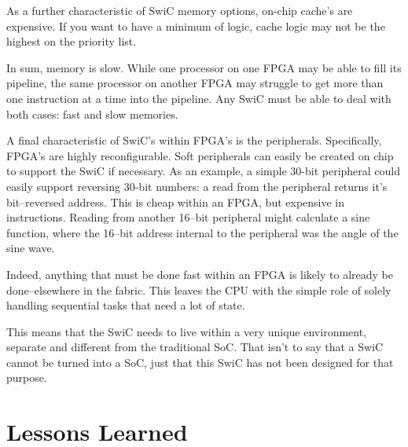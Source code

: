 \documentclass{gqtekspec}
\begin{document}
As a further characteristic of SwiC memory options, on-chip cache's are
expensive.  If you want to have a minimum of logic, cache logic may not be
the highest on the priority list.

In sum, memory is slow.  While one processor on one FPGA may be able to fill
its pipeline, the same processor on another FPGA may struggle to get more than
one instruction at a time into the pipeline.  Any SwiC must be able to deal
with both cases: fast and slow memories.

A final characteristic of SwiC's within FPGA's is the peripherals. 
Specifically, FPGA's are highly reconfigurable.  Soft peripherals can easily
be created on chip to support the SwiC if necessary.  As an example, a simple
30-bit peripheral could easily support reversing 30-bit numbers: a read from
the peripheral returns it's bit--reversed address.  This is cheap within an
FPGA, but expensive in instructions.  Reading from another 16--bit peripheral
might calculate a sine function, where the 16--bit address internal to the
peripheral was the angle of the sine wave.

Indeed, anything that must be done fast within an FPGA is likely to already
be done--elsewhere in the fabric.  This leaves the CPU with the simple role
of solely handling sequential tasks that need a lot of state.

This means that the SwiC needs to live within a very unique environment,
separate and different from the traditional SoC.  That isn't to say that a 
SwiC cannot be turned into a SoC, just that this SwiC has not been designed
for that purpose.

\section{Lessons Learned}
\end{document}
